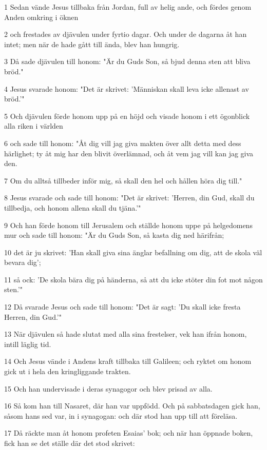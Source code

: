 \par 1 Sedan vände Jesus tillbaka från Jordan, full av helig ande, och fördes genom Anden omkring i öknen
\par 2 och frestades av djävulen under fyrtio dagar. Och under de dagarna åt han intet; men när de hade gått till ända, blev han hungrig.
\par 3 Då sade djävulen till honom: "Är du Guds Son, så bjud denna sten att bliva bröd."
\par 4 Jesus svarade honom: "Det är skrivet: 'Människan skall leva icke allenast av bröd.'"
\par 5 Och djävulen förde honom upp på en höjd och visade honom i ett ögonblick alla riken i världen
\par 6 och sade till honom: "Åt dig vill jag giva makten över allt detta med dess härlighet; ty åt mig har den blivit överlämnad, och åt vem jag vill kan jag giva den.
\par 7 Om du alltså tillbeder inför mig, så skall den hel och hållen höra dig till."
\par 8 Jesus svarade och sade till honom: "Det är skrivet: 'Herren, din Gud, skall du tillbedja, och honom allena skall du tjäna.'"
\par 9 Och han förde honom till Jerusalem och ställde honom uppe på helgedomens mur och sade till honom: "Är du Guds Son, så kasta dig ned härifrån;
\par 10 det är ju skrivet: 'Han skall giva sina änglar befallning om dig, att de skola väl bevara dig';
\par 11 så ock: 'De skola bära dig på händerna, så att du icke stöter din fot mot någon sten.'"
\par 12 Då svarade Jesus och sade till honom: "Det är sagt: 'Du skall icke fresta Herren, din Gud.'"
\par 13 När djävulen så hade slutat med alla sina frestelser, vek han ifrån honom, intill läglig tid.
\par 14 Och Jesus vände i Andens kraft tillbaka till Galileen; och ryktet om honom gick ut i hela den kringliggande trakten.
\par 15 Och han undervisade i deras synagogor och blev prisad av alla.
\par 16 Så kom han till Nasaret, där han var uppfödd. Och på sabbatsdagen gick han, såsom hans sed var, in i synagogan: och där stod han upp till att föreläsa.
\par 17 Då räckte man åt honom profeten Esaias' bok; och när han öppnade boken, fick han se det ställe där det stod skrivet:
